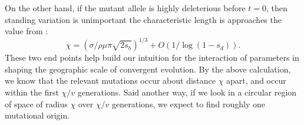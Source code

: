 \documentclass{article}
\begin{document}
On the other hand, if the mutant allele is highly deleterious before $t=0$,
then standing variation is unimportant the characteristic length is approaches the value from \citet{ralphcoop2010}:
\begin{equation} \label{eqn:chi_new}
\chi = ( \sigma / \rho \mu \pi \sqrt{2 s_b} )^{1/3} + O(1/\log(1-s_d)).
\end{equation}
These two end points help build our intuition for the interaction of
parameters in shaping the geographic scale of convergent evolution.
By the above calculation, we know that the relevant mutations occur about distance $\chi$ apart, 
 and occur within the first $\chi/v$ generations.
 Said another way, if we look in a circular region of space of radius $\chi$ over $\chi/v$ generations,
 we expect to find roughly one mutational origin.


\end{document}
